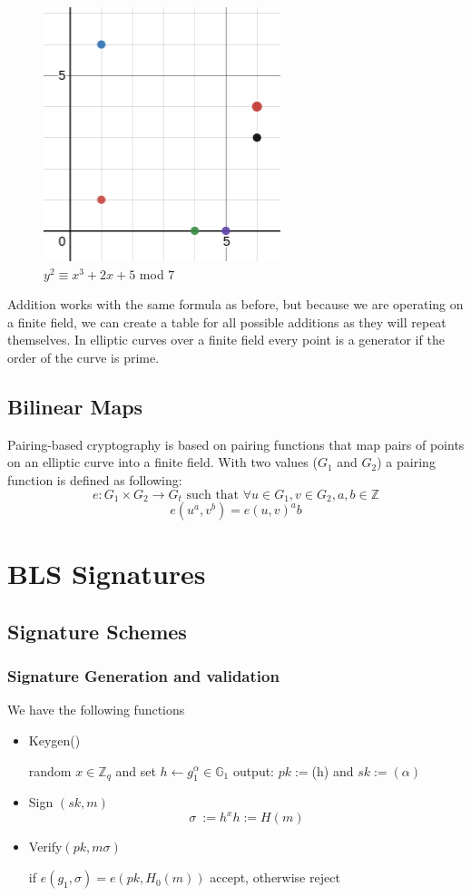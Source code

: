\documentclass[a4paper,12pt]{scrartcl}
\begin{document}
\begin{figure}[hbt!]
	\centering
	\includegraphics[width=0.5\linewidth]{ec3}
	\caption{$y^2 \equiv x^3 + 2x + 5$ mod $7$}
\end{figure}

Addition works with the same formula as before, but because we are operating on a finite field, we can create a table for all possible additions as they will repeat themselves. In elliptic curves over a finite field every point is a generator if the order of the curve is prime.

\subsection{Bilinear Maps}
Pairing-based cryptography is based on pairing functions that map pairs of points on an elliptic curve into a finite field.
With two values ($G_1$ and $G_2$) a pairing function is defined as following:
\[ e: G_1 \times G_2 \rightarrow G_t \text{ such that } \forall u \in G_1, v \in G_2, a, b \in \mathbb{Z} \]
\[ e(u^a,v^b) = e(u,v)^ab \]

\pagebreak

\section{BLS Signatures}
\subsection{Signature Schemes}
\subsubsection{Signature Generation and validation}
We have the following functions
\begin{itemize}
	\item Keygen()
	\begin{center}
		random \( x\in \mathbb{Z}_{q} \) and set \( h \leftarrow g_{1}^\alpha\in \mathbb{G}_{1} \) output: \( pk := \)(h) and \( sk := (\alpha) \)
	\end{center}
	\item Sign \( (sk, m) \)
	\[ \sigma\ := h^x  h := H(m) \]
	\item Verify\( (pk, m \sigma) \)
	\begin{center}
		if \( e(g_{1},\sigma) = e(pk, H_{0}(m)) \) accept, otherwise reject
	\end{center}
\end{itemize}
\end{document}
